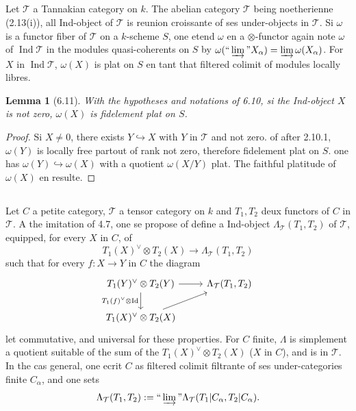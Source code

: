 \documentclass[12pt,a4paper]{article}
\theoremstyle{plain}
\newtheorem{lemma}[theorem]{Lemma}
\theoremstyle{definition}
\DeclareMathOperator{\Id}{Id}
\DeclareMathOperator{\Ind}{Ind}
\begin{document}
\subsection{}

Let $\mathcal{T}$ a Tannakian category on $k$. The abelian category $\mathcal{T}$ being noetherienne (2.13(i)), all Ind-object of $\mathcal{T}$ is reunion croissante of ses under-objects in $\mathcal{T}$. Si $\omega$ is a functor fiber of $\mathcal{T}$ on a $k$-scheme $S$, one etend $\omega$ en a $\otimes$-functor again note $\omega$ of $\Ind\mathcal{T}$ in the modules quasi-coherents on $S$ by $\omega(\text{``}\varinjlim\text{''} X_\alpha) = \varinjlim \omega(X_\alpha)$. For $X$ in $\Ind\mathcal{T}$, $\omega(X)$ is plat on $S$ en tant that filtered colimit of modules locally libres.

\begin{lemma}[6.11]
With the hypotheses and notations of 6.10, si the Ind-object $X$ is not zero, $\omega(X)$ is fidelement plat on $S$.
\end{lemma}

\begin{proof}
Si $X \neq 0$, there exists $Y \hookrightarrow X$ with $Y$ in $\mathcal{T}$ and not zero. of after 2.10.1, $\omega(Y)$ is locally free partout of rank not zero, therefore fidelement plat on $S$. one has $\omega(Y) \hookrightarrow \omega(X)$ with a quotient $\omega(X/Y)$ plat. The faithful platitude of $\omega(X)$ en resulte.
\end{proof}

\subsection{}

Let $C$ a petite category, $\mathcal{T}$ a tensor category on $k$ and $T_1, T_2$ deux functors of $C$ in $\mathcal{T}$. A the imitation of 4.7, one se propose of define a Ind-object $\Lambda_\mathcal{T}(T_1, T_2)$ of $\mathcal{T}$, equipped, for every $X$ in $C$, of
\begin{equation}\label{eq:6.12.1}
T_1(X)^\vee \otimes T_2(X) \to \Lambda_\mathcal{T}(T_1, T_2)
\end{equation}
such that for every $f : X \to Y$ in $C$ the diagram
\begin{equation}\label{eq:6.12.2}
\begin{tikzcd}
T_1(Y)^\vee \otimes T_2(Y) \arrow[r] \arrow[d, "T_1(f)^\vee \otimes \Id"'] & \Lambda_\mathcal{T}(T_1, T_2) \\
T_1(X)^\vee \otimes T_2(X) \arrow[ur]
\end{tikzcd}
\end{equation}
let commutative, and universal for these properties. For $C$ finite, $\Lambda$ is simplement a quotient suitable of the sum of the $T_1(X)^\vee \otimes T_2(X)$ ($X$ in $C$), and is in $\mathcal{T}$. In the cas general, one ecrit $C$ as filtered colimit filtrante of ses under-categories finite $C_\alpha$, and one sets
\[
\Lambda_\mathcal{T}(T_1, T_2) := \text{``}\varinjlim\text{''} \Lambda_\mathcal{T}(T_1|C_\alpha, T_2|C_\alpha).
\]
\end{document}
